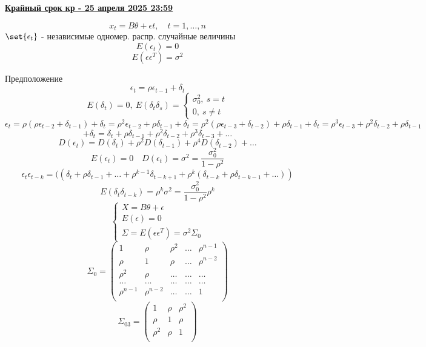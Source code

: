 \documentclass[a4paper]{article}
\DeclarePairedDelimiter\set\{\}
\theoremstyle{definition}
\theoremstyle{remark}
\begin{document}
\textbf{\underline{Крайный срок кр - 25 апреля 2025 23:59}}

\[
    x_t = B\theta + \epsilon t, \quad t = 1, \dots, n
\]
$ \set{\epsilon_t} $ - независимые одномер. распр. случайные величины
\[
    E(\epsilon_t) = 0
\]
\[
    E(\epsilon \epsilon^T) = \sigma^2
\]

Предположение
\[
    \epsilon_t = \rho \epsilon_{t-1} + \delta_t
\]
\[
    E(\delta_t) = 0, \ E(\delta_t \delta_s) = \begin{cases}
        \sigma_0^2, \ s = t\\
        0,\  s \neq t
    \end{cases}
\]
\[
    \epsilon_t  = \rho(\rho \epsilon_{t-2} + \delta_{t-1}) + \delta_t = 
    \rho^2 \epsilon_{t-2} + \rho \delta_{t-1} + \delta_t = \rho^2(\rho \epsilon_{t-3}
    + \delta_{t-2}) + \rho\delta_{t-1} + \delta_t = \rho^3
    \epsilon_{t-3} + \rho^2\delta_{t-2} + \rho \delta_{t-1}
\]
\[
    + \delta_t = \delta_t + \rho \delta_{t-1} + \rho^2 \delta_{t-2} + \rho^3
    \delta_{t-3} + \dots
\]
\[
    D(\epsilon_t) = D(\delta_t) + \rho^2 D(\delta_{t-1}) + \rho^4 D(\delta_{t-2}) + \dots
\]
\[
    E(\epsilon_t) = 0 \quad D(\epsilon_t) = \sigma^2 = \frac{\sigma_0^2}{1-\rho^2} 
\]
\[
    \epsilon_t \epsilon_{t-k} = ((\delta_t + \rho \delta_{t-1} + \dots +
    \rho^{k-1}\delta_{t-k+1} + \rho^k(\delta_{t-k} + \rho \delta_{t-k-1} + \dots))
\]
\[
    E(\delta_t \delta_{t-k}) = \rho^k \sigma^2 = \frac{\sigma_0^2}{1-\rho^2} 
    \rho^k
\]
\[
    \begin{cases}
        X = B\theta + \epsilon\\
        E(\epsilon) = 0\\
        \Sigma = E(\epsilon \epsilon^T) = \sigma^2 \Sigma_0
    \end{cases}
\]
\[
    \Sigma_0 = \begin{pmatrix}
    1 & \rho & \rho^2 & \dots & \rho^{n-1}\\
    \rho & 1 & \rho & \dots & \rho^{n-2}\\
    \rho^2 & \rho & \dots & \dots & \dots\\
    \dots & \dots & \dots & \dots & \dots\\
    \rho^{n-1} & \rho^{n-2} & \dots & \dots & 1\\
    
    \end{pmatrix}
\]
\[
    \Sigma_{03} = \begin{pmatrix}
    1 & \rho & \rho^2\\
    \rho & 1 & \rho\\
    \rho^2 & \rho & 1\\
    
    \end{pmatrix}
\]
\end{document}
